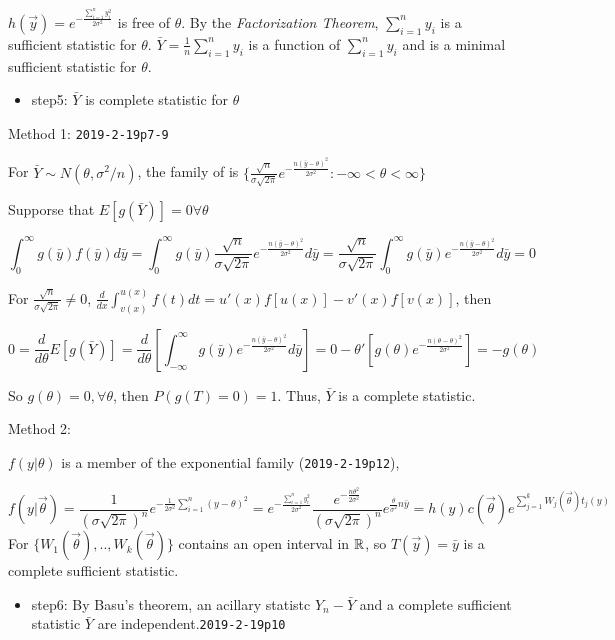 \documentclass[12pt,]{article}
\providecommand{\tightlist}{%
  \setlength{\itemsep}{0pt}\setlength{\parskip}{0pt}}
\begin{document}
\(h(\vec y)=e^{-\frac{\sum_{i=1}^ny_i^2}{2\sigma^2}}\) is free of
\(\theta\). By the \emph{Factorization Theorem}, \(\sum_{i=1}^ny_i\) is
a sufficient statistic for \(\theta\). \(\bar Y=\frac1n\sum_{i=1}^ny_i\)
is a function of \(\sum_{i=1}^ny_i\) and is a minimal sufficient
statistic for \(\theta\).

\begin{itemize}
\tightlist
\item
  step5: \(\bar Y\) is complete statistic for \(\theta\)
\end{itemize}

Method 1: \texttt{2019-2-19p7-9}

For \(\bar Y\sim N(\theta,\sigma^2/n)\), the family of is
\(\{\frac{\sqrt{n}}{\sigma\sqrt{2\pi}}e^{-\frac{n(\bar y-\theta)^2}{2\sigma^2}}:-\infty<\theta<\infty\}\)

Supporse that \(E[g(\bar Y)]=0\forall\theta\)

\[\int_{0}^\infty g(\bar y)f(\bar y)d\bar y=\int_0^\infty g(\bar y)\frac{\sqrt{n}}{\sigma\sqrt{2\pi}}e^{-\frac{n(\bar y-\theta)^2}{2\sigma^2}}d\bar y=\frac{\sqrt{n}}{\sigma\sqrt{2\pi}}\int_0^\infty g(\bar y)e^{-\frac{n(\bar y-\theta)^2}{2\sigma^2}}d\bar y=0\]

For \(\frac{\sqrt{n}}{\sigma\sqrt{2\pi}}\neq0\),
\(\frac{d}{dx}\int_{v(x)}^{u(x)}{f(t)}dt=u'(x)f[u(x)]-v'(x)f[v(x)]\),
then

\[0=\frac{d}{d\theta}E[g(\bar Y)]=\frac{d}{d\theta}\left[\int_{-\infty}^\infty g(\bar y)e^{-\frac{n(\bar y-\theta)^2}{2\sigma^2}}d\bar y\right]=0-\theta'[g(\theta)e^{-\frac{n(\theta-\theta)^2}{2\sigma^2}}]=-g(\theta)\]

So \(g(\theta)=0,\forall\theta\), then \(P(g(T)=0)=1\). Thus, \(\bar Y\)
is a complete statistic.

Method 2:

\(f(y|\theta)\) is a member of the exponential family
(\texttt{2019-2-19p12}),

\[f(y|\vec\theta)=\frac1{(\sigma\sqrt{2\pi})^n}e^{-\frac{1}{2\sigma^2}\sum_{i=1}^n(y-\theta)^2}=e^{-\frac{\sum_{i=1}^ny_i^2}{2\sigma^2}}\frac{e^{-\frac{n\theta^2}{2\sigma^2}}}{(\sigma\sqrt{2\pi})^n}e^{\frac{\theta}{\sigma^2}n\bar y}=h(y)c(\vec \theta)e^{\sum^k_{j=1}W_j(\vec \theta)t_j(y)}\]
For \(\{W_1(\vec \theta),..,W_k(\vec \theta)\}\) contains an open
interval in \(\Bbb R\), so \(T(\vec y)=\bar y\) is a complete sufficient
statistic.

\begin{itemize}
\tightlist
\item
  step6: By Basu's theorem, an acillary statistc \(Y_n-\bar Y\) and a
  complete sufficient statistic \(\bar Y\) are
  independent.\texttt{2019-2-19p10}
\end{itemize}
\end{document}

